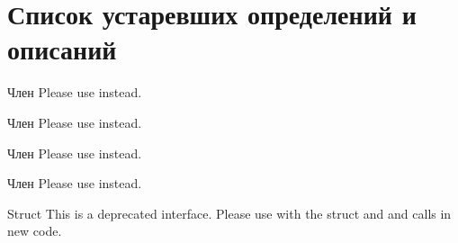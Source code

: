 \chapter{Список устаревших определений и описаний}
\hypertarget{deprecated}{}\label{deprecated}

\begin{DoxyRefList}
\item[Член \doxylink{vorbisenc_8h_a34c3170d227b6368041e59c1dc7ed6e4}{OV\+\_\+\+ECTL\+\_\+\+RATEMANAGE\+\_\+\+AVG} ]\label{deprecated__deprecated000004}%
%
Please use  instead. 
\item[Член \doxylink{vorbisenc_8h_a614481c0d84bdfbb80eed9208b68f779}{OV\+\_\+\+ECTL\+\_\+\+RATEMANAGE\+\_\+\+GET} ]\label{deprecated__deprecated000002}%
%
Please use  instead. 
\item[Член \doxylink{vorbisenc_8h_af8869980a805f431af57a50dffbf5d33}{OV\+\_\+\+ECTL\+\_\+\+RATEMANAGE\+\_\+\+HARD} ]\label{deprecated__deprecated000005}%
%
Please use  instead. 
\item[Член \doxylink{vorbisenc_8h_a1daa1fd8ce1064cce01dde3ad447d389}{OV\+\_\+\+ECTL\+\_\+\+RATEMANAGE\+\_\+\+SET} ]\label{deprecated__deprecated000003}%
%
Please use  instead. 
\item[Struct \doxylink{structovectl__ratemanage__arg}{ovectl\+\_\+ratemanage\+\_\+arg} ]\label{deprecated__deprecated000001}%
%
This is a deprecated interface. Please use  with the  struct and  and  calls in new code.
\end{DoxyRefList}